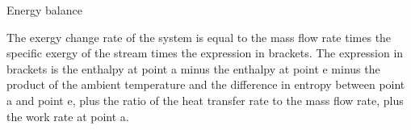 Energy balance

The exergy change rate of the system is equal to the mass flow rate times the specific exergy of the stream times the expression in brackets. The expression in brackets is the enthalpy at point a minus the enthalpy at point e minus the product of the ambient temperature and the difference in entropy between point a and point e, plus the ratio of the heat transfer rate to the mass flow rate, plus the work rate at point a.